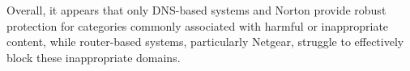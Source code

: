 Overall, it appears that only DNS-based systems and Norton provide robust protection for categories commonly associated with harmful or inappropriate content, while router-based systems, particularly Netgear, struggle to effectively block these inappropriate domains.

